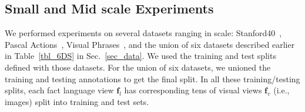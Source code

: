 \documentclass[runningheads]{llncs}
\begin{document}
\begin{comment}
\end{comment}\vspace{-2mm}\subsection{Small and Mid scale Experiments}\vspace{-2mm}%
We  performed experiments on several  datasets ranging in scale: Stanford40~\cite{yao2011human}, Pascal Actions~\cite{yao2010grouplet}, Visual Phrases~\cite{sadeghi2011recognition}, and the union of six datasets described earlier in Table~\ref{tbl_6DS} in Sec.~\ref{sec_data}. We used the training and test splits defined with those datasets. For the union of six datasets, we unioned the training and testing annotations to get the final split.  In all these training/testing splits, each fact language view $\mathbf{f}_l$ has corresponding tens of visual views $\mathbf{f}_v$ (i.e., images)
split into training and test sets.
\end{document}
